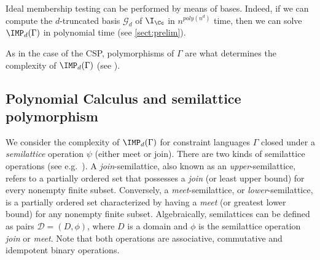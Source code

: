 \documentclass[11pt]{article}
\begin{document}
Ideal membership testing can be performed by means of \GB bases. Indeed, if we can compute the $d$-truncated \GB basis $\mathcal{G}_d$ of $\I_\Cc$ in $n^{poly(n^d)}$ time, then we can solve $\IMP_d(\Gamma)$ in polynomial time (see \cref{sect:prelim}).
%

As in the case of the CSP, polymorphisms of $\Gamma$ are what determines the complexity of $\IMP_d(\Gamma)$ (see \cite{Mastrolilli21TALG,BharathiM21, BulatovRSTOC22}). 
 

\subsection{Polynomial Calculus and semilattice polymorphism}\label{sect:PCsemilattice}

We consider the complexity of $\IMP_d(\Gamma)$ for constraint languages $\Gamma$ closed under a \emph{semilattice} operation $\psi$ (either meet or join). 
There are two kinds of semilattice operations (see e.g.~\cite{Davey_Priestley_2002}). A \emph{join}-semilattice, also known as an \emph{upper}-semilattice, refers to a partially ordered set that possesses a \emph{join} (or least upper bound) for every nonempty finite subset. Conversely, a \emph{meet}-semilattice, or \emph{lower}-semilattice, is a partially ordered set characterized by having a \emph{meet} (or greatest lower bound) for any nonempty finite subset. 
%
Algebraically, semilattices can be defined {as pairs $\mathcal{D} = (D,\phi)$, where $D$ is a domain and $\phi$ is the semilattice operation \textit{join} or \textit{meet}. Note that both operations are associative, commutative and idempotent binary operations.} 
\end{document}
